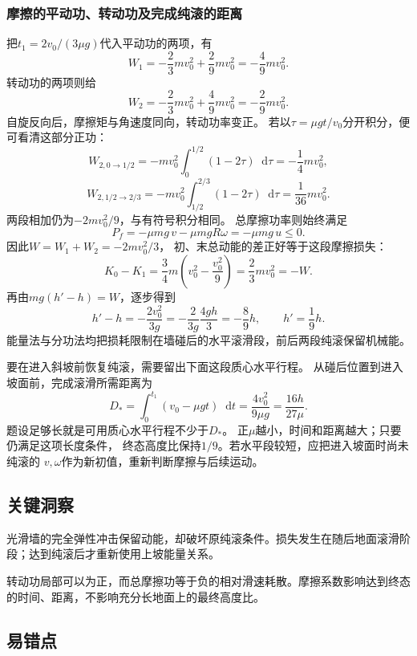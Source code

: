 \documentclass[UTF8,fontset=fandol,a4paper,11pt]{ctexart}
\newcommand{\dd}{\mathop{}\!\mathrm{d}}
\begin{document}
\subsubsection*{摩擦的平动功、转动功及完成纯滚的距离}
把$t_1=2v_0/(3\mu g)$代入平动功的两项，有
\[
W_1=-\frac23mv_0^2+\frac29mv_0^2
=-\frac49mv_0^2.
\]
转动功的两项则给
\[
W_2=-\frac23mv_0^2+\frac49mv_0^2
=-\frac29mv_0^2.
\]
自旋反向后，摩擦矩与角速度同向，转动功率变正。
若以$\tau=\mu gt/v_0$分开积分，便可看清这部分正功：
\[
W_{2,0\to1/2}=-mv_0^2\int_0^{1/2}(1-2\tau)\dd\tau
=-\frac14mv_0^2,
\]
\[
W_{2,1/2\to2/3}=-mv_0^2\int_{1/2}^{2/3}(1-2\tau)\dd\tau
=\frac1{36}mv_0^2.
\]
两段相加仍为$-2mv_0^2/9$，与有符号积分相同。
总摩擦功率则始终满足
\[
P_f=-\mu mg\,v-\mu mgR\omega=-\mu mg\,u\leq0.
\]
因此$W=W_1+W_2=-2mv_0^2/3$，
初、末总动能的差正好等于这段摩擦损失：
\[
K_0-K_1=\frac34m\left(v_0^2-\frac{v_0^2}{9}\right)
=\frac23mv_0^2=-W.
\]
再由$mg(h'-h)=W$，逐步得到
\[
h'-h=-\frac{2v_0^2}{3g}
=-\frac{2}{3g}\frac{4gh}{3}
=-\frac89h,
\qquad h'=\frac19h.
\]
能量法与分功法均把损耗限制在墙碰后的水平滚滑段，前后两段纯滚保留机械能。

要在进入斜坡前恢复纯滚，需要留出下面这段质心水平行程。
从碰后位置到进入坡面前，完成滚滑所需距离为
\[
D_* =\int_0^{t_1}(v_0-\mu gt)\dd t
=\frac{4v_0^2}{9\mu g}=\frac{16h}{27\mu}.
\]
题设足够长就是可用质心水平行程不少于$D_*$。
正$\mu$越小，时间和距离越大；只要仍满足这项长度条件，
终态高度比保持$1/9$。若水平段较短，应把进入坡面时尚未纯滚的
$v,\omega$作为新初值，重新判断摩擦与后续运动。




\subsection*{关键洞察}

光滑墙的完全弹性冲击保留动能，却破坏原纯滚条件。损失发生在随后地面滚滑阶段；达到纯滚后才重新使用上坡能量关系。

转动功局部可以为正，而总摩擦功等于负的相对滑速耗散。摩擦系数影响达到终态的时间、距离，不影响充分长地面上的最终高度比。



\subsection*{易错点}
\end{document}
